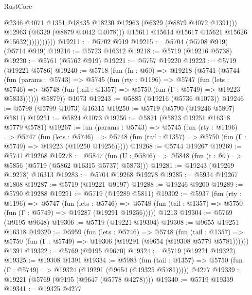 \begin{lexlean}{RustCore}
\begin{coremodule}
                              @2346
                              @4071
                              @1351
                              @18435
                              @18230
                              @12963
                              (@6329 (@8879 @4072 @1391)))
                            @12963
                            (@6329 (@8879 @4042 @4078)))
                          @15611
                          @15614
                          @15617
                          @15621
                          @15626
                          @15632)))))))))))
@19211 := @5702 @919
@19215 := @5704 (@5708 @919) (@5714 @919)
@19216 := @5723 @16312
@19218 := @5719 (@19216 @5738)
@19220 := @5761 (@5762 @919)
@19221 := @5757 @19220
@19223 := @5719 (@19221 @5786)
@19240 := @5718
    (fun (fn : @60) =>
    @19218
      (@5741
        (@5744
          (fun (params : @5743) =>
          @5745
            (fun (rty : @1196) =>
            @5747
              (fun (lets : @5746) =>
              @5748 (fun (tail : @1357) => @5750 (fun (Γ : @5749) => @19223 @5833))))))
        @5879))
    @1073
@19243 := @5885 (@19216 (@5736 @1073))
@19246 := @5798 (@5799 @1073) @16315
@19250 := @5719 (@5790 (@19246 @5807) @5811)
@19251 := @5824 @1073
@19256 := @5821 (@5823 @19251 @16318 @5779 @5781)
@19267 := fun (params : @5743) =>
  @5745
    (fun (rty : @1196) =>
    @5747
      (fun (lets : @5746) =>
      @5748 (fun (tail : @1357) => @5750 (fun (Γ : @5749) => @19223 (@19250 @19256)))))
@19268 := @5744 @19267
@19269 := @5741 @19268
@19278 := @5847
    (fun (U : @5846) => @5848 (fun (t : @7) => @5856 (@5719 (@5862 @16315 @5737) @5873)))
@19281 := @19243 (@19269 @19278) @16313
@19283 := @5704 @19268 @19278
@19285 := @5934 @19267 @1808
@19287 := @5719 (@19221 @9197)
@19288 := @19246 @9200
@19289 := @5790 @19288
@19291 := @5719 (@19289 @5811)
@19302 := @5937
    (fun (rty : @1196) =>
    @5747
      (fun (lets : @5746) =>
      @5748 (fun (tail : @1357) => @5750 (fun (Γ : @5749) => @19287 (@19291 @19256)))))
    @1213
@19304 := @5769 (@9195 @9648)
@19306 := @5719 (@19221 @19304)
@19308 := @9655 @19251 @16318
@19320 := @5959
    (fun (lets : @5746) =>
    @5748
      (fun (tail : @1357) =>
      @5750 (fun (Γ : @5749) => @19306 (@19291 (@9654 (@19308 @5779 @5781))))))
    @1391
@19322 := @5769 (@9195 @9670)
@19324 := @5719 (@19221 @19322)
@19325 := @19308 @1391
@19334 := @5983
    (fun (tail : @1357) => @5750 (fun (Γ : @5749) => @19324 (@19291 (@9654 (@19325 @5781)))))
    @4277
@19339 := @19221 (@5769 (@9195 (@9647 (@5778 @4278))))
@19340 := @5719 @19339
@19341 := @19325 @4277

\end{coremodule}
\end{lexlean}
